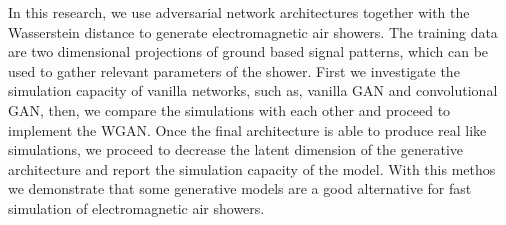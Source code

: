 \begin{extraAbstract}
In this research, we use adversarial network architectures together with the Wasserstein distance to generate electromagnetic air showers. The training data are two dimensional projections of ground based signal patterns, which can be used to gather relevant parameters of the shower. First we investigate the simulation capacity of vanilla networks, such as, vanilla GAN and convolutional GAN, then, we compare the simulations with each other and proceed to implement the WGAN. Once the final architecture is able to produce real like simulations, we proceed to decrease the latent dimension of the generative architecture and report the simulation capacity of the model. With this methos we demonstrate that some generative models are a good alternative for fast simulation of electromagnetic air showers.
\end{extraAbstract}